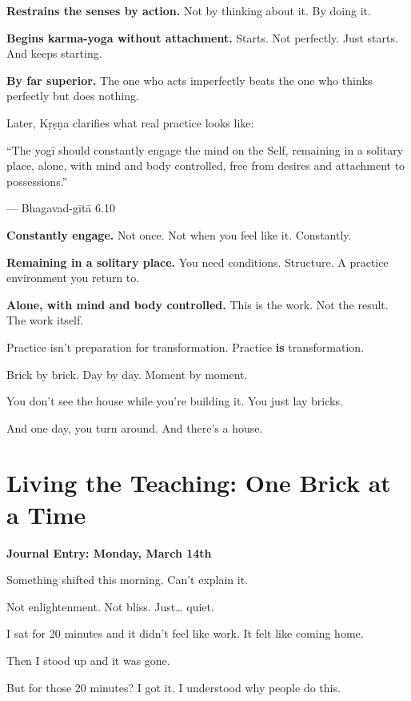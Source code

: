\documentclass[11pt,twoside]{book}
\begin{document}
\textbf{\textbf{Restrains the senses by action.}} Not by thinking about it. By doing it.

\textbf{\textbf{Begins karma-yoga without attachment.}} Starts. Not perfectly. Just starts. And keeps starting.

\textbf{\textbf{By far superior.}} The one who acts imperfectly beats the one who thinks perfectly but does nothing.

Later, Kṛṣṇa clarifies what real practice looks like:

\begin{pullquote}
``The yogī should constantly engage the mind on the Self, remaining in a solitary place, alone, with mind and body controlled, free from desires and attachment to possessions.''

--- Bhagavad-gītā 6.10
\end{pullquote}

\textbf{\textbf{Constantly engage.}} Not once. Not when you feel like it. Constantly.

\textbf{\textbf{Remaining in a solitary place.}} You need conditions. Structure. A practice environment you return to.

\textbf{\textbf{Alone, with mind and body controlled.}} This is the work. Not the result. The work itself.

Practice isn't preparation for transformation. Practice \textbf{is} transformation.

Brick by brick. Day by day. Moment by moment.

You don't see the house while you're building it. You just lay bricks.

And one day, you turn around. And there's a house.

\section*{Living the Teaching: One Brick at a Time}

\textbf{Journal Entry: Monday, March 14th}

Something shifted this morning. Can't explain it.

Not enlightenment. Not bliss. Just\ldots{} quiet.

I sat for 20 minutes and it didn't feel like work. It felt like coming home.

Then I stood up and it was gone.

But for those 20 minutes? I got it. I understood why people do this.
\end{document}
